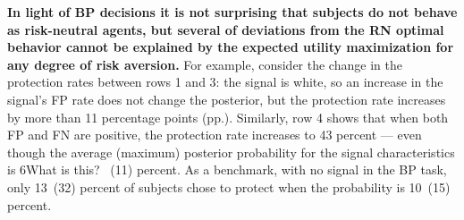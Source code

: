 \documentclass[12pt,a4paper]{article}
\newcommand{\pmt}[1]{{\color{Blue}#1}}
\begin{document}
\textbf{In light of BP decisions it is not surprising that subjects do not behave as risk-neutral agents, but several of deviations from the RN optimal behavior cannot be explained by the expected utility maximization for any degree of risk aversion.} For example, consider the change in the protection rates between rows 1 and 3: the signal is white, so an increase in the signal's FP rate does not change the posterior, but the protection rate increases by more than 11 percentage points (pp.). Similarly, row 4 shows that when both FP and FN are positive, the protection rate increases to 43 percent --- even though the average (maximum) posterior probability for the signal characteristics is 6\pmt{What is this? ~(11)} percent. As a benchmark, with no signal in the BP task, only 13~(32) percent of subjects chose to protect when the probability is 10~(15) percent. 


\begin{table}[H]\centering 
\caption{Average Protection by Signal Type} 
\label{tab:nonparIP}
\end{table}
\end{document}
